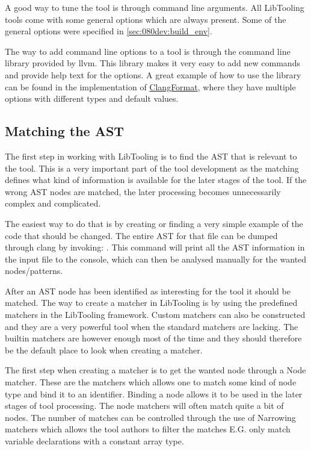 A good way to tune the tool is through command line arguments. All LibTooling tools come with some general options which are always present. Some of the general options were specified in \cref{sec:080dev:build_env}.

The way to add command line options to a tool is through the command line library provided by llvm. This library makes it very easy to add new commands and provide help text for the options. A great example of how to use the library can be found in the implementation of \href{https://github.com/llvm/llvm-project/blob/main/clang/tools/clang-format/ClangFormat.cpp}{ClangFormat}, where they have multiple options with different types and default values.

\subsection{Matching the AST} \label{subsec:080dev:ASTNodeMatching}

The first step in working with LibTooling is to find the AST that is relevant to the tool. This is a very important part of the tool development as the matching defines what kind of information is available for the later stages of the tool. If the wrong AST nodes are matched, the later processing becomes unnecessarily complex and complicated.

The easiest way to do that is by creating or finding a very simple example of the code that should be changed. The entire AST for that file can be dumped through clang by invoking: . 
This command will print all the AST information in the input file to the console, which can then be analysed manually for the wanted nodes/patterns.

After an AST node has been identified as interesting for the tool it should be matched. The way to create a matcher in LibTooling is by using the predefined matchers in the LibTooling framework.\cite{ASTMatcherReference} Custom matchers can also be constructed and they are a very powerful tool when the standard matchers are lacking. The builtin matchers are however enough most of the time and they should therefore be the default place to look when creating a matcher. 

The first step when creating a matcher is to get the wanted node through a Node matcher. These are the matchers which allows one to match some kind of node type and bind it to an identifier. Binding a node allows it to be used in the later stages of tool processing. The node matchers will often match quite a bit of nodes. The number of matches can be controlled through the use of Narrowing matchers which allows the tool authors to filter the matches E.G. only match variable declarations with a constant array type.

